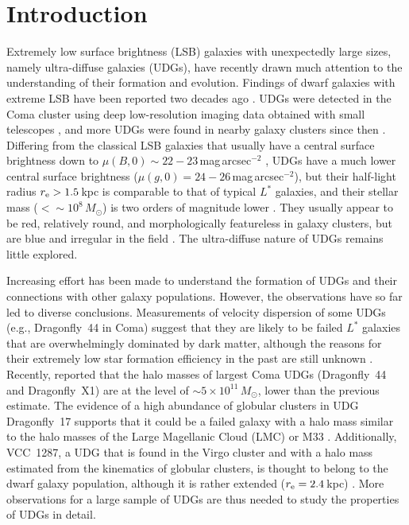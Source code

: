 \documentclass[twocolumn,trackchanges]{aastex61}
\newcommand\latex{La\TeX}
\begin{document}

\section{Introduction} \label{sec:intro}

Extremely low surface brightness (LSB) galaxies with unexpectedly large sizes, namely ultra-diffuse galaxies (UDGs), have recently drawn much attention to the understanding of their formation and evolution. Findings of dwarf galaxies with extreme LSB have been reported two decades ago \citep[e.g.,][]{Impey1988,Bothun1991}. UDGs were detected in the Coma cluster using deep low-resolution imaging data obtained with small telescopes \citep{van Dokkum2015a}, and more UDGs were found in nearby galaxy clusters since then \citep{Koda2015,Mihos2015,Munoz2015,Beasley2016,vanderBurg2016,Koch2016,Roman2017}. Differing from the classical LSB galaxies that usually have a central surface brightness down to $\mu(B,0) \sim 22-23$\,mag\,arcsec$^{-2}$ \citep{Impey1997, Impey2001, Ceccarelli2012,Geller2012}, UDGs have a much lower central surface brightness ($\mu(g,0)=24-26$\,mag\,arcsec$^{-2}$), but their half-light radius $r_{\rm e} >1.5$\,kpc is comparable to that of typical $L^\ast$ galaxies, and their stellar mass ($<\sim 10^{8}$\,$M_{\odot}$) is two orders of magnitude lower \citep{van Dokkum2015a}. They usually appear to be red, relatively round, and morphologically featureless in galaxy clusters, but are blue and irregular in the field \citep{Merritt2016,Leisman2017,Roman2017,RomanTrujillo2016,Trujillo2017}. The ultra-diffuse nature of UDGs remains little explored. 

Increasing effort has been made to understand the formation of UDGs and their connections with other galaxy populations. However, the observations have so far led to diverse conclusions. Measurements of velocity dispersion of some UDGs (e.g., Dragonfly~44 in Coma) suggest that they are likely to be failed $L^\ast$ galaxies that are overwhelmingly dominated by dark matter, although the reasons for their extremely low star formation efficiency in the past are still unknown \citep{van Dokkum2016}. Recently, \cite{van Dokkum2017} reported that the halo masses of largest Coma UDGs (Dragonfly~44 and Dragonfly~X1) are at the level of $\sim 5 \times 10^{11}\,M_{\odot}$, lower than the previous estimate. The evidence of a high abundance of globular clusters in UDG Dragonfly~17 supports that it could be a failed galaxy with a halo mass similar to the halo masses of the Large Magellanic Cloud (LMC) or M33 \citep{BeasleTrujillo2016,Peng2016}. Additionally, VCC~1287, a UDG that is found in the Virgo cluster and with a halo mass estimated from the kinematics of globular clusters, is thought to belong to the dwarf galaxy population, although it is rather extended ($r_{\rm e}=2.4$\,kpc) \citep{Beasley2016}. More observations for a large sample of UDGs are thus needed to study the properties of UDGs in detail. 
\end{document}
